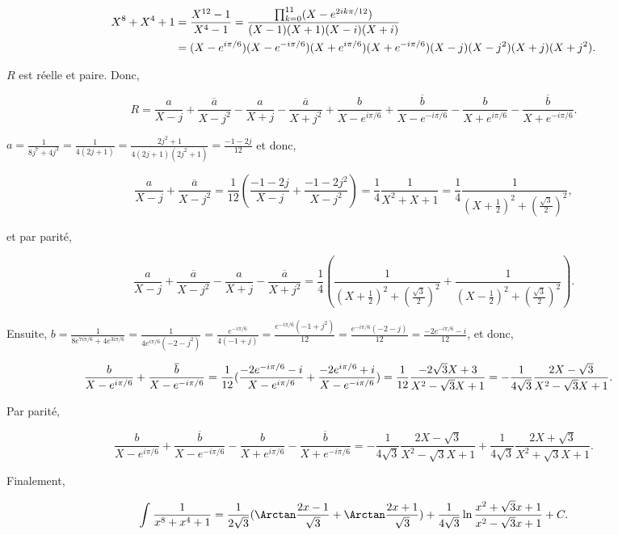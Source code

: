 {{\begin{enumerate}
\begin{align*}\ensuremath
X^8+X^4+1&=\frac{X^{12}-1}{X^4-1}=\frac{\prod_{k=0}^{11}(X-e^{2ik\pi/12})}{(X-1)(X+1)(X-i)(X+i)}\\
 &=(X-e^{i\pi/6})(X-e^{-i\pi/6})(X+e^{i\pi/6})(X+e^{-i\pi/6})(X-j)(X-j^2)(X+j)(X+j^2).
\end{align*}

$R$ est réelle et paire. Donc,

$$R=\frac{a}{X-j}+\frac{\overline{a}}{X-j^2}-\frac{a}{X+j}-\frac{\overline{a}}{X+j^2}+\frac{b}{X-e^{i\pi/6}}
+\frac{\overline{b}}{X-e^{-i\pi/6}}-\frac{b}{X+e^{i\pi/6}}-\frac{\overline{b}}{X+e^{-i\pi/6}}.$$

$a=\frac{1}{8j^7+4j^3}=\frac{1}{4(2j+1)}=\frac{2j^2+1}{4(2j+1)(2j^2+1)}=\frac{-1-2j}{12}$ et donc,

$$\frac{a}{X-j}+\frac{\overline{a}}{X-j^2}=\frac{1}{12}(\frac{-1-2j}{X-j}+\frac{-1-2j^2}{X-j^2})
=\frac{1}{4}\frac{1}{X^2+X+1}=\frac{1}{4}\frac{1}{(X+\frac{1}{2})^2+(\frac{\sqrt{3}}{2})^2},$$

 et par parité,
 
$$\frac{a}{X-j}+\frac{\overline{a}}{X-j^2}-\frac{a}{X+j}-\frac{\overline{a}}{X+j^2}=
\frac{1}{4}(\frac{1}{(X+\frac{1}{2})^2+(\frac{\sqrt{3}}{2})^2}+\frac{1}{(X-\frac{1}{2})^2+(\frac{\sqrt{3}}{2})^2}).$$

Ensuite, $b=\frac{1}{8e^{7i\pi/6}+4e^{3i\pi/6}}=\frac{1}{4e^{i\pi/6}(-2-j^2)}=\frac{e^{-i\pi/6}}{4(-1+j)}
=\frac{e^{-i\pi/6}(-1+j^2)}{12}=\frac{e^{-i\pi/6}(-2-j)}{12}=\frac{-2e^{-i\pi/6}-i}{12}$, et donc,

\begin{align*}\ensuremath
\frac{b}{X-e^{i\pi/6}}
+\frac{\overline{b}}{X-e^{-i\pi/6}}&=\frac{1}{12}(\frac{-2e^{-i\pi/6}-i}{X-e^{i\pi/6}}+\frac{-2e^{i\pi/6}+i}{X-e^{-i\pi/6}})=\frac{1}{12}\frac{-2\sqrt{3}X+3}{X^2-\sqrt{3}X+1}=-\frac{1}{4\sqrt{3}}\frac{2X-\sqrt{3}}{X^2-\sqrt{3}X+1}.
\end{align*}

Par parité,

$$\frac{b}{X-e^{i\pi/6}}
+\frac{\overline{b}}{X-e^{-i\pi/6}}-\frac{b}{X+e^{i\pi/6}}-\frac{\overline{b}}{X+e^{-i\pi/6}}=
-\frac{1}{4\sqrt{3}}\frac{2X-\sqrt{3}}{X^2-\sqrt{3}X+1}+\frac{1}{4\sqrt{3}}\frac{2X+\sqrt{3}}{X^2+\sqrt{3}X+1}.$$

Finalement,

$$\int_{}^{}\frac{1}{x^8+x^4+1}=\frac{1}{2\sqrt{3}}(\Arctan\frac{2x-1}{\sqrt{3}}+\Arctan\frac{2x+1}{\sqrt{3}})+\frac{1}{4\sqrt{3}}\ln\frac{x^2+\sqrt{3}x+1}{x^2-\sqrt{3}x+1}+C.$$


\end{enumerate}}}
